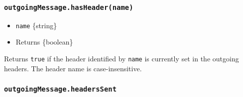 \begin{Shaded}
\begin{Highlighting}[]
\NormalTok{(}\OperatorTok{,} \NormalTok{)}\OperatorTok{;}
\NormalTok{(}\OperatorTok{,}\NormalTok{ [}\OperatorTok{,} \NormalTok{])}\OperatorTok{;}

\OperatorTok{=}\NormalTok{()}\OperatorTok{;}
\end{Highlighting}
\end{Shaded}

\subsubsection{\texorpdfstring{\texttt{outgoingMessage.hasHeader(name)}}{outgoingMessage.hasHeader(name)}}\label{outgoingmessage.hasheadername}

\begin{itemize}
\tightlist
\item
  \texttt{name} \{string\}
\item
  Returns \{boolean\}
\end{itemize}

Returns \texttt{true} if the header identified by \texttt{name} is
currently set in the outgoing headers. The header name is
case-insensitive.

\begin{Shaded}
\begin{Highlighting}[]
\OperatorTok{=}\NormalTok{(}\NormalTok{)}\OperatorTok{;}
\end{Highlighting}
\end{Shaded}

\subsubsection{\texorpdfstring{\texttt{outgoingMessage.headersSent}}{outgoingMessage.headersSent}}\label{outgoingmessage.headerssent}

